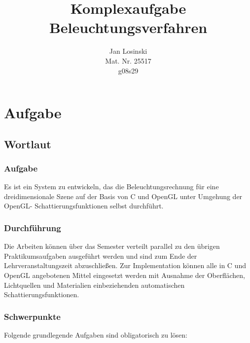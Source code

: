 \documentclass[final,a4paper,11pt,notitlepage,halfparskip]{scrreprt}
\title{Komplexaufgabe\\
Beleuchtungsverfahren}
\author{Jan Losinski\\
\small{Mat. Nr. 25517}\\
\small{g08s29}}
\begin{document}
\maketitle

\tableofcontents

\chapter{Aufgabe}
\section{Wortlaut}
\subsection{Aufgabe}
Es ist ein System zu entwickeln, das die Beleuchtungsrechnung für eine dreidimensionale
Szene auf der Basis von C und OpenGL unter Umgehung der OpenGL-
Schattierungsfunktionen selbst durchführt.

\subsection{Durchführung}
Die Arbeiten können über das Semester verteilt parallel zu den übrigen Praktikumsaufgaben
ausgeführt werden und sind zum Ende der Lehrveranstaltungszeit abzuschließen. Zur
Implementation können alle in C und OpenGL angebotenen Mittel eingesetzt werden mit
Ausnahme der Oberflächen, Lichtquellen und Materialien einbeziehenden automatischen
Schattierungsfunktionen.

\subsection{Schwerpunkte}
Folgende grundlegende Aufgaben sind obligatorisch zu lösen:
\end{document}
